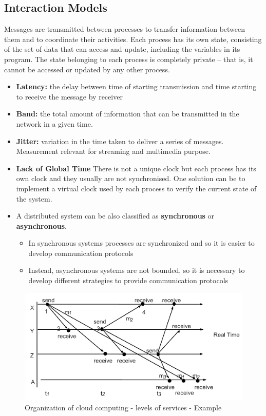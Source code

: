 \subsection{Interaction Models}
Messages are transmitted between processes to transfer information between them and to coordinate their activities. Each process has its own state, consisting of the set of data that can access and update, including the variables in its program. The state belonging to each process is completely private – that is, it cannot be accessed or updated by any other process.
\begin{itemize}
    \item \textbf{Latency:} the delay between time of starting transmission and time starting to receive the message by receiver
    \item \textbf{Band:} the total amount of information that can be transmitted in the network in a given time.
    \item \textbf{Jitter:} variation in the time taken to deliver a series of messages. Measurement relevant for streaming and multimedia purpose.
    \item \textbf{Lack of Global Time} There is not a unique clock but each process has its own clock and they usually are not synchronised. One solution can be to implement a virtual clock used by each process to verify the current state of the system.
    \item A distributed system can be also classified as \textbf{synchronous} or \textbf{asynchronous}.
    \begin{itemize}
        \item In synchronous systems processes are synchronized and so it is easier to develop communication protocols
        \item Instead, asynchronous systems are not bounded, so it is necessary to develop different strategies to provide communication protocols
    \end{itemize}
\end{itemize}
\begin{figure}[!h]
            \centering
            \includegraphics[width=.7\linewidth]{images/modelOfSystems/ReceiversInDIfferentOrder.jpeg}
            \caption{Organization of cloud computing - levels of services - Example
}
    \end{figure}
\newpage

